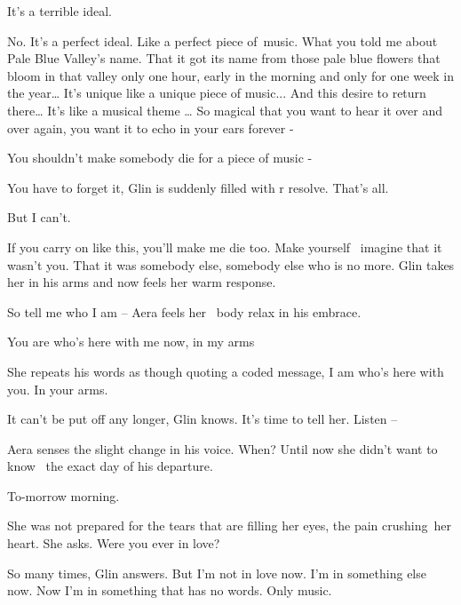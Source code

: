 \documentclass[letterpaper]{article}
\begin{document}
{\textquotedbl}It's a terrible ideal.{\textquotedbl} 

{\textquotedbl}No. It's a perfect ideal. Like a perfect piece of~music. What you told me about Pale Blue Valley's name.
That it got its name from those pale blue flowers that bloom in that valley only one hour, early in the morning and
only for one week in the year{\dots} It's unique like a unique piece of music... And this desire to return there{\dots}
It's like a musical theme {\dots} So magical that you want to hear it over and over again, you want it to echo in your
ears forever -{\textquotedbl} 

{\textquotedbl}You shouldn't make somebody die for a piece of music -{\textquotedbl} 

{\textquotedbl}You have to forget it,{\textquotedbl} Glin is suddenly filled with r resolve. {\textquotedbl}That's
all.{\textquotedbl} 

{\textquotedbl}But I can't.{\textquotedbl} 

{\textquotedbl}If you carry on like this, you'll make me die too. Make\textcolor{red}{ }yourself\textcolor{red}{
\ }imagine that it wasn't you. That it was somebody else, somebody else who is no more.{\textquotedbl} Glin takes her
in his arms and now feels her warm response. 

{\textquotedbl}So tell me who I am -- {\textquotedbl} Aera feels her \ body relax in his embrace.

{\textquotedbl}You are who's here with me now, in my arms{\textquotedbl} 

She repeats his words as though quoting a coded message, {\textquotedbl}I am who's here with you. In your
arms.{\textquotedbl}

It can't be put off any longer, Glin knows. It's time to tell her. {\textquotedbl}Listen --{\textquotedbl} 

Aera senses the slight change in his voice. {\textquotedbl}When?{\textquotedbl} Until now she didn't want to know \ the
exact day of his departure.

{\textquotedbl}To-morrow morning.{\textquotedbl} 

She was not prepared for the tears that are filling her eyes, the pain crushing~her heart. She asks. {\textquotedbl}Were
you ever in love?{\textquotedbl} 

{\textquotedbl}So many times,{\textquotedbl} Glin answers. {\textquotedbl}But I'm not in love now. I'm in something else
now. Now I'm in something that has no words. Only music.{\textquotedbl} ~
\end{document}
